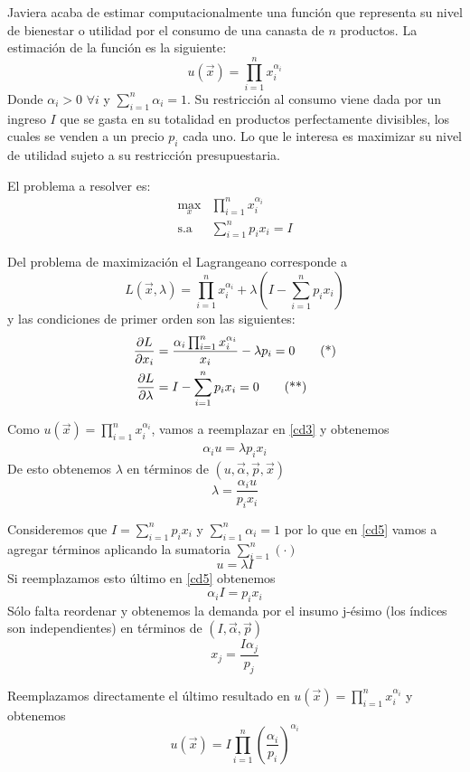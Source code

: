 \begin{ejemplo}\label{ejemplo-micro-4}
Javiera acaba de estimar computacionalmente una funci\'on que representa su nivel de bienestar o utilidad por el consumo de una canasta de $n$ productos. La estimaci\'on de la funci\'on es la siguiente:
$$u(\vec{x}) = \prod_{i=1}^n x_i^{\alpha_i}$$
Donde $\alpha_i > 0$ $\forall i$ y $\sum_{i=1}^n \alpha_i = 1$. Su restricci\'on al consumo viene dada por un ingreso $I$ que se gasta en su totalidad en productos perfectamente divisibles, los cuales se venden a un precio $p_i$ cada uno. Lo que le interesa es maximizar su nivel de utilidad sujeto a su restricci\'on presupuestaria.

El problema a resolver es:
\begin{equation*}
\begin{array}{cl}
\displaystyle \max_x 		& \prod_{i=1}^n x_i^{\alpha_i} 	 \\
\text{s.a}					& \sum_{i=1}^n p_i x_i = I
\end{array}
\end{equation*}

Del problema de maximizaci\'on el Lagrangeano corresponde a
$$L(\vec{x},\lambda) = \prod_{i=1}^n x_i^{\alpha_i} + \lambda\left(I-\sum_{i=1}^n p_i x_i\right)$$
y las condiciones de primer orden son las siguientes:
	\begin{align} 
	\label{cd3} \frac{\partial L}{\partial x_i} &= \frac{\alpha_i \prod_{i=1}^n x_i^{\alpha_i}}{x_i} - \lambda p_i = 0 \tag{*} \\ 
	\label{cd4} \frac{\partial L}{\partial \lambda} &= I - \sum_{i=1}^n p_i x_i = 0 \tag{**}
	\end{align}

Como $u(\vec{x}) = \prod_{i=1}^n x_i^{\alpha_i}$, vamos a reemplazar en \eqref{cd3} y obtenemos
	\begin{gather} \label{cd5} 
	\alpha_i u = \lambda p_i x_i \tag{***}
	\end{gather}
De esto obtenemos $\lambda$ en t\'erminos de $(u,\vec{\alpha},\vec{p},\vec{x})$
$$\lambda = \frac{\alpha_i u}{p_i x_i}$$

Consideremos que $I = \sum_{i=1}^n p_i x_i$ y $\sum_{i=1}^n \alpha_i = 1$ por lo que en \eqref{cd5} vamos a agregar t\'erminos aplicando la sumatoria $\sum_{i=1}^n (\cdot)$
$$u =  \lambda I$$
Si reemplazamos esto \'ultimo en \eqref{cd5} obtenemos
$$ \alpha_i I = p_i x_i$$
S\'olo falta reordenar y obtenemos la demanda por el insumo j-\'esimo (los \'indices son independientes) en t\'erminos de $(I,\vec{\alpha},\vec{p})$
$$x_j = \frac{I \alpha_j}{p_j}$$

\item Reemplazamos directamente el \'ultimo resultado en $u(\vec{x}) = \prod_{i=1}^n x_i^{\alpha_i}$ y obtenemos
$$u(\vec{x}) = I \prod_{i=1}^n \left(\frac{\alpha_i}{p_i}\right)^{\alpha_i}$$
\end{ejemplo}


